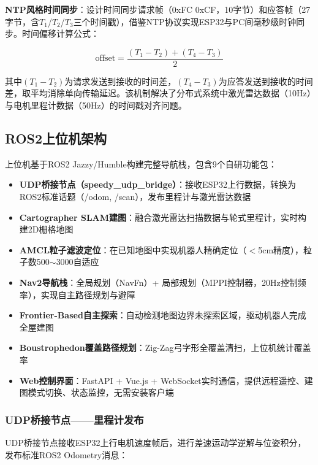 \documentclass[12pt,a4paper]{ctexart}
\begin{document}
\textbf{NTP风格时间同步}：设计时间同步请求帧（0xFC 0xCF，10字节）和应答帧（27字节，含$T_1$/$T_2$/$T_3$三个时间戳），借鉴NTP协议实现ESP32与PC间毫秒级时钟同步。时间偏移计算公式：

\begin{equation}
    \text{offset} = \frac{(T_1 - T_2) + (T_4 - T_3)}{2}
\end{equation}

\noindent 其中$(T_1-T_2)$为请求发送到接收的时间差，$(T_4-T_3)$为应答发送到接收的时间差，取平均消除单向传输延迟。该机制解决了分布式系统中激光雷达数据（10Hz）与电机里程计数据（50Hz）的时间戳对齐问题。

\subsection{ROS2上位机架构}

上位机基于ROS2 Jazzy/Humble构建完整导航栈，包含9个自研功能包：

\begin{itemize}
    \item \textbf{UDP桥接节点（speedy\_udp\_bridge）}：接收ESP32上行数据，转换为ROS2标准话题（/odom, /scan），发布里程计与激光雷达数据
    \item \textbf{Cartographer SLAM建图}：融合激光雷达扫描数据与轮式里程计，实时构建2D栅格地图
    \item \textbf{AMCL粒子滤波定位}：在已知地图中实现机器人精确定位（$<$5cm精度），粒子数500$\sim$3000自适应
    \item \textbf{Nav2导航栈}：全局规划（NavFn）+ 局部规划（MPPI控制器，20Hz控制频率），实现自主路径规划与避障
    \item \textbf{Frontier-Based自主探索}：自动检测地图边界未探索区域，驱动机器人完成全屋建图
    \item \textbf{Boustrophedon覆盖路径规划}：Zig-Zag弓字形全覆盖清扫，上位机统计覆盖率
    \item \textbf{Web控制界面}：FastAPI + Vue.js + WebSocket实时通信，提供远程遥控、建图模式切换、状态监控，无需安装客户端
\end{itemize}

\subsubsection{UDP桥接节点——里程计发布}

UDP桥接节点接收ESP32上行电机速度帧后，进行差速运动学逆解与位姿积分，发布标准ROS2 Odometry消息：
\end{document}
